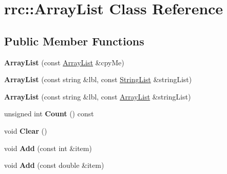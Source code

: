 \hypertarget{classrrc_1_1_array_list}{}\section{rrc\+:\+:Array\+List Class Reference}
\label{classrrc_1_1_array_list}
\subsection*{Public Member Functions}
\begin{DoxyCompactItemize}
\item 
\hypertarget{classrrc_1_1_array_list_ab351e4ed183f97535958ddb134a80874}{}{\bfseries Array\+List} (const \hyperlink{classrrc_1_1_array_list}{Array\+List} \&cpy\+Me)\label{classrrc_1_1_array_list_ab351e4ed183f97535958ddb134a80874}

\item 
\hypertarget{classrrc_1_1_array_list_a24981ffd511c7cf6fe93715986212926}{}{\bfseries Array\+List} (const string \&lbl, const \hyperlink{classrrc_1_1_string_list}{String\+List} \&string\+List)\label{classrrc_1_1_array_list_a24981ffd511c7cf6fe93715986212926}

\item 
\hypertarget{classrrc_1_1_array_list_a492fb3faf13cfb147db307274a57817f}{}{\bfseries Array\+List} (const string \&lbl, const \hyperlink{classrrc_1_1_array_list}{Array\+List} \&string\+List)\label{classrrc_1_1_array_list_a492fb3faf13cfb147db307274a57817f}

\item 
\hypertarget{classrrc_1_1_array_list_ae7dfc9ec5dd825d8b9d45c8a38cf681f}{}unsigned int {\bfseries Count} () const \label{classrrc_1_1_array_list_ae7dfc9ec5dd825d8b9d45c8a38cf681f}

\item 
\hypertarget{classrrc_1_1_array_list_a6d22e5484fe31175fe32cf265761b3d9}{}void {\bfseries Clear} ()\label{classrrc_1_1_array_list_a6d22e5484fe31175fe32cf265761b3d9}

\item 
\hypertarget{classrrc_1_1_array_list_a089704fb780cf44be8276704c69f0349}{}void {\bfseries Add} (const int \&item)\label{classrrc_1_1_array_list_a089704fb780cf44be8276704c69f0349}

\item 
\hypertarget{classrrc_1_1_array_list_a26f8913ef433202a57ed86dfaea7bd00}{}void {\bfseries Add} (const double \&item)\label{classrrc_1_1_array_list_a26f8913ef433202a57ed86dfaea7bd00}


\end{DoxyCompactItemize}
